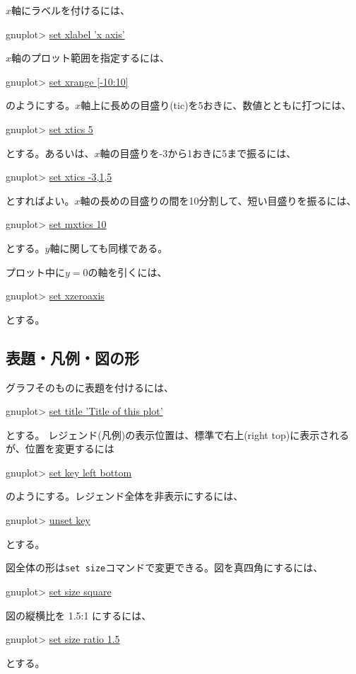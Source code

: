 \(x\)軸にラベルを付けるには、
\begin{commandline2}
    gnuplot> \underline{set xlabel 'x axis'}
\end{commandline2} \noindent
\(x\)軸のプロット範囲を指定するには、
\begin{commandline2}
    gnuplot> \underline{set xrange [-10:10]}
\end{commandline2} \noindent
のようにする。\(x\)軸上に長めの目盛り(tic)を5おきに、数値とともに打つには、
\begin{commandline2}
    gnuplot> \underline{set xtics 5}
\end{commandline2} \noindent
とする。あるいは、\(x\)軸の目盛りを-3から1おきに5まで振るには、
\begin{commandline2}
    gnuplot> \underline{set xtics -3,1,5}
\end{commandline2} \noindent
とすればよい。\(x\)軸の長めの目盛りの間を10分割して、短い目盛りを振るには、
\begin{commandline2}
    gnuplot> \underline{set mxtics 10}
\end{commandline2} \noindent
とする。\(y\)軸に関しても同様である。

プロット中に\(y=0\)の軸を引くには、
\begin{commandline2}
    gnuplot> \underline{set xzeroaxis}
\end{commandline2} \noindent
とする。

\subsection{表題・凡例・図の形}

グラフそのものに表題を付けるには、
\begin{commandline2}
    gnuplot> \underline{set title 'Title of this plot'}
\end{commandline2} \noindent
とする。
レジェンド(凡例)の表示位置は、標準で右上(right top)に表示されるが、位置を変更するには
\begin{commandline2}
    gnuplot> \underline{set key left bottom}
\end{commandline2} \noindent
のようにする。レジェンド全体を非表示にするには、
\begin{commandline2}
    gnuplot> \underline{unset key}
\end{commandline2} \noindent
とする。

図全体の形は\texttt{set size}コマンドで変更できる。図を真四角にするには、
\begin{commandline2}
    gnuplot> \underline{set size square}
\end{commandline2} \noindent
図の縦横比を 1.5:1 にするには、
\begin{commandline2}
    gnuplot> \underline{set size ratio 1.5}
\end{commandline2} \noindent
とする。

